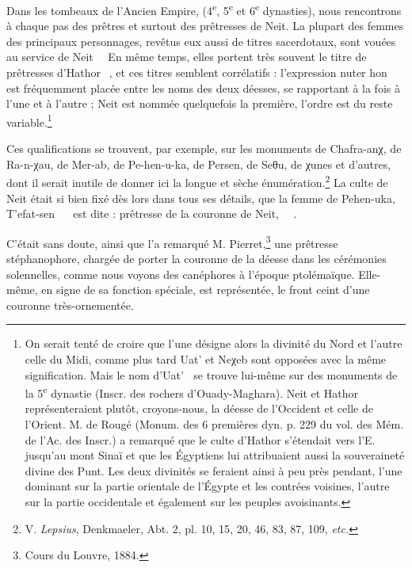 \documentclass[a4paper, 11pt, oneside]{article}
\newcommand*\hieroglyhicsAAAG{}
\newcommand*\hieroglyhicsAAAO{}
\newcommand*\hieroglyhicsAAAQ{}
\newcommand*\hieroglyhicsAAAY{}
\newcommand*\hieroglyhicsAABF{}
\newcommand*\hieroglyhicsAACB{\raisebox{0.5ex}{}}
\newcommand*\hieroglyhicsAACN{\raisebox{1ex}{}}
\newcommand*\hieroglyhicsAACS{}
\newcommand*\hieroglyhicsAAEK{}
\newcommand*\hieroglyhicsAAHC{}
\newcommand*\hieroglyhicsAAQY{}
\newcommand*\hieroglyhicsAARM{}
\newcommand*\hieroglyhicsAARN{}
\newcommand*\hieroglyhicsAARP{}
\newcommand*\hieroglyhicsAARQ{\raisebox{0.5ex}{}}
\begin{document}
Dans les tombeaux de l'Ancien Empire, (4\textsuperscript{e}, 5\textsuperscript{e} et 6\textsuperscript{e} dynasties), nous rencontrons à chaque pas des prêtres et surtout des prêtresses de Neit. La plupart des femmes des principaux personnages, revêtus eux aussi de titres sacerdotaux, sont vouées au service de Neit $\hieroglyhicsAAAQ\:\hieroglyhicsAABF\allowbreak\:\hieroglyhicsAAEK\:\hieroglyhicsAAHC$ En même temps, elles portent très souvent le titre de prêtresses d'Hathor $\hieroglyhicsAARM\:\hieroglyhicsAAEK\:\hieroglyhicsAAHC$, et ces titres semblent corrélatifs : l'expression nuter hon $\hieroglyhicsAAEK\:\hieroglyhicsAAHC$ est fréquemment placée entre les noms des deux déesses, se rapportant à la fois à l'une et à l'autre ; Neit est nommée quelquefois la première, l'ordre est du reste variable.\footnote{On serait tenté de croire que l'une désigne alors la divinité du Nord et l'autre celle du Midi, comme plus tard Uat' et Neχeb sont opposées avec la même signification. Mais le nom d'Uat' $\hieroglyhicsAAAY\:\hieroglyhicsAARN$ se trouve lui-même sur des monuments de la 5\textsuperscript{e} dynastie (Inscr. des rochers d'Ouady-Maghara). Neit et Hathor représenteraient plutôt, croyons-nous, la déesse de l'Occident et celle de l'Orient. M. de Rougé (Monum. des 6 premières dyn. p. 229 du vol. des Mém. de l'Ac. des Inscr.) a remarqué que le culte d'Hathor s'étendait vers l'E. jusqu'au mont Sinaï et que les Égyptiens lui attribuaient aussi la souveraineté divine des Punt. Les deux divinités se feraient ainsi à peu près pendant, l'une dominant sur la partie orientale de l'Égypte et les contrées voisines, l'autre sur la partie occidentale et également sur les peuples avoisinants.}

Ces qualifications se trouvent, par exemple, sur les monuments de Chafra-anχ, de Ra-n-χau, de Mer-ab, de Pe-hen-u-ka, de Persen, de Seθu, de χunes et d'autres, dont il serait inutile de donner ici la longue et sèche énumération.\footnote{V. \emph{Lepsius}, Denkmaeler, Abt. 2, pl. 10, 15, 20, 46, 83, 87, 109, \emph{etc.}} La culte de Neit était si bien fixé dès lors dans tous ses détails, que la femme de Pehen-uka, T'efat-sen $\hieroglyhicsAAQY\:\hieroglyhicsAAAG\:\hieroglyhicsAACB\allowbreak\:\hieroglyhicsAACS\:\hieroglyhicsAACN$ est dite : prêtresse de la couronne de Neit, $\hieroglyhicsAAAO\:\hieroglyhicsAARP\:\hieroglyhicsAARQ\allowbreak\:\hieroglyhicsAAEK\:\hieroglyhicsAAHC$.

C'était sans doute, ainsi que l'a remarqué M. Pierret,\footnote{Cours du Louvre, 1884.} une prêtresse stéphanophore, chargée de porter la couronne de la déesse dans les cérémonies solennelles, comme nous voyons des canéphores à l'époque ptolémaïque. Elle-même, en signe de sa fonction spéciale, est représentée, le front ceint d'une couronne très-ornementée.
\end{document}
